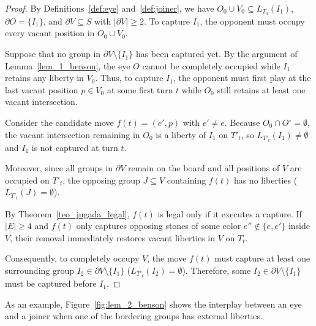 \begin{proof}
	By Definitions~\ref{def:eye} and~\ref{def:joiner}, we have $O_0 \cup V_0 \subseteq L_{T_0}(I_1)$, $\partial O = \{I_1\}$, and $\partial V \subseteq S$ with $|\partial V| \ge 2$. To capture $I_1$, the opponent must occupy every vacant position in $O_0 \cup V_0$.
	
	Suppose that no group in $\partial V \setminus \{I_1\}$ has been captured yet. By the argument of Lemma~\ref{lem_1_benson}, the eye $O$ cannot be completely occupied while $I_1$ retains any liberty in $V_0$. Thus, to capture $I_1$, the opponent must first play at the last vacant position $p \in V_0$ at some first turn $t$ while $O_0$ still retains at least one vacant intersection.
	
	Consider the candidate move $f(t) = (e', p)$ with $e' \neq e$. Because $O_0 \cap O^\circ = \emptyset$, the vacant intersection remaining in $O_0$ is a liberty of $I_1$ on $T'_t$, so $L_{T'_t}(I_1) \neq \emptyset$ and $I_1$ is not captured at turn $t$. 
	
	Moreover, since all groups in $\partial V$ remain on the board and all positions of $V$ are occupied on $T'_t$, the opposing group $J \subseteq V$ containing $f(t)$ has no liberties ($L_{T'_t}(J) = \emptyset$).
	
	By Theorem~\ref{teo_jugada_legal}, $f(t)$ is legal only if it executes a capture. If $|E| \ge 4$ and $f(t)$ only captures opposing stones of some color $e'' \notin \{e, e'\}$ inside $V$, their removal immediately restores vacant liberties in $V$ on $T_t$.
	
	Consequently, to completely occupy $V$, the move $f(t)$ must capture at least one surrounding group $I_2 \in \partial V \setminus \{I_1\}$ ($L_{T'_t}(I_2) = \emptyset$). Therefore, some $I_2 \in \partial V \setminus \{I_1\}$ must be captured before $I_1$.
\end{proof}

As an example, Figure~\ref{fig:lem_2_benson} shows the interplay between an eye and a joiner when one of the bordering groups has external liberties.

